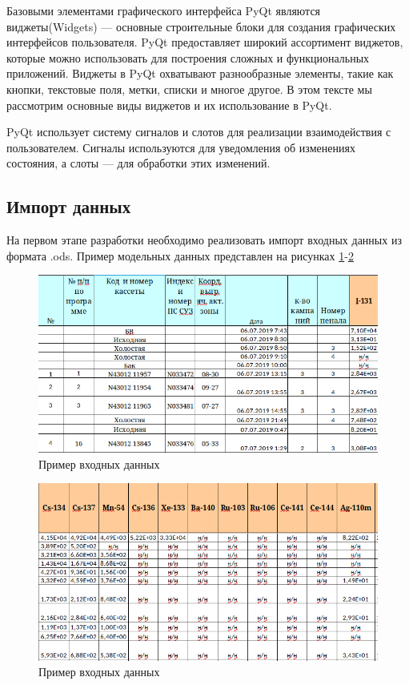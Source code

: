 Базовыми элементами графического интерфейса PyQt являются виджеты(Widgets) --- основные строительные блоки для создания графических интерфейсов пользователя. PyQt предоставляет широкий ассортимент виджетов, которые можно использовать для построения сложных и функциональных приложений. Виджеты в PyQt охватывают разнообразные элементы, такие как кнопки, текстовые поля, метки, списки и многое другое. В этом тексте мы рассмотрим основные виды виджетов и их использование в PyQt.

PyQt использует систему сигналов и слотов для реализации взаимодействия с пользователем. Сигналы используются для уведомления об изменениях состояния, а слоты — для обработки этих изменений.

\subsection{Импорт данных}

На первом этапе разработки необходимо реализовать импорт входных данных из формата .ods. Пример модельных данных представлен на рисунках \ref{fig:ris4}-\ref{fig:ris5} 

\begin{figure}[H]
	\centering
	\includegraphics[width=1\linewidth]{pics/ris4} %
	\caption{Пример входных данных}
	\label{fig:ris4} %
\end{figure}

\begin{figure}[H]
	\centering
	\includegraphics[width=1\linewidth]{pics/ris5} %
	\caption{Пример входных данных}
	\label{fig:ris5} %
\end{figure}

